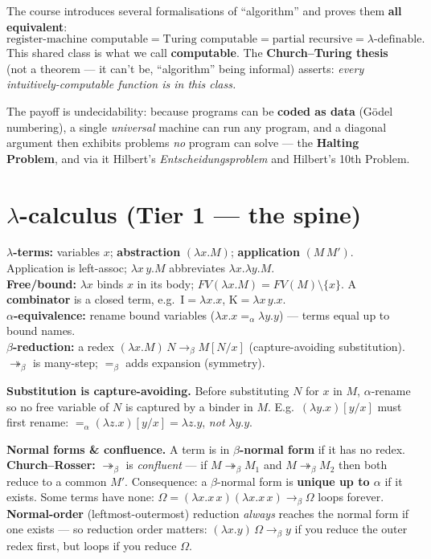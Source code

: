 \documentclass[11pt,a4paper]{article}
\newcommand{\lam}{\lambda}
\newcommand{\bred}{\to_\beta}
\newcommand{\breds}{\twoheadrightarrow_\beta}
\newcommand{\beq}{=_\beta}
\begin{document}
\begin{must}
The course introduces several formalisations of ``algorithm'' and proves them \textbf{all equivalent}:
\[
\text{register-machine computable} = \text{Turing computable} = \text{partial recursive} = \lambda\text{-definable}.
\]
This shared class is what we call \textbf{computable}. The \textbf{Church--Turing thesis} (not a theorem --- it can't be, ``algorithm'' being informal) asserts: \emph{every intuitively-computable function is in this class.}
\end{must}

The payoff is undecidability: because programs can be \textbf{coded as data} (G\"odel numbering), a single \emph{universal} machine can run any program, and a diagonal argument then exhibits problems \emph{no} program can solve --- the \textbf{Halting Problem}, and via it Hilbert's \emph{Entscheidungsproblem} and Hilbert's 10th Problem.

\section{$\lambda$-calculus (Tier 1 --- the spine)}

\begin{must}[title=Syntax, alpha, beta]
\textbf{$\lambda$-terms:} variables $x$; \textbf{abstraction} $(\lam x.M)$; \textbf{application} $(M\,M')$. Application is left-assoc; $\lam x\,y.M$ abbreviates $\lam x.\lam y.M$.\\[2pt]
\textbf{Free/bound:} $\lam x$ binds $x$ in its body; $FV(\lam x.M)=FV(M)\setminus\{x\}$. A \textbf{combinator} is a closed term, e.g.\ $\mathrm I=\lam x.x$, $\mathrm K=\lam x\,y.x$.\\[2pt]
\textbf{$\alpha$-equivalence:} rename bound variables ($\lam x.x =_\alpha \lam y.y$) --- terms equal up to bound names.\\[2pt]
\textbf{$\beta$-reduction:} a redex $(\lam x.M)\,N \bred M[N/x]$ (capture-avoiding substitution). $\breds$ is many-step; $\beq$ adds expansion (symmetry).
\end{must}

\begin{gotcha}
\textbf{Substitution is capture-avoiding.} Before substituting $N$ for $x$ in $M$, $\alpha$-rename so no free variable of $N$ is captured by a binder in $M$. E.g.\ $(\lam y.x)[y/x]$ must first rename: $=_\alpha(\lam z.x)[y/x]=\lam z.y$, \emph{not} $\lam y.y$.
\end{gotcha}

\begin{useful}
\textbf{Normal forms \& confluence.} A term is in \textbf{$\beta$-normal form} if it has no redex. \textbf{Church--Rosser:} $\breds$ is \emph{confluent} --- if $M\breds M_1$ and $M\breds M_2$ then both reduce to a common $M'$. Consequence: a $\beta$-normal form is \textbf{unique up to $\alpha$} if it exists. Some terms have none: $\Omega=(\lam x.x\,x)(\lam x.x\,x)\bred\Omega$ loops forever. \textbf{Normal-order} (leftmost-outermost) reduction \emph{always} reaches the normal form if one exists --- so reduction order matters: $(\lam x.y)\,\Omega\bred y$ if you reduce the outer redex first, but loops if you reduce $\Omega$.
\end{useful}
\end{document}
